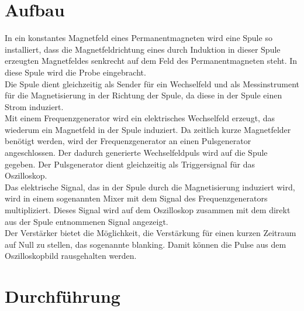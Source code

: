\documentclass[12pt,a4paper]{article}
\begin{document}
\section{Aufbau}
In ein konstantes Magnetfeld eines Permanentmagneten wird eine Spule so installiert, dass die Magnetfeldrichtung eines durch Induktion in dieser Spule erzeugten Magnetfeldes senkrecht auf dem Feld des Permanentmagneten steht. In diese Spule wird die Probe eingebracht. \\
Die Spule dient gleichzeitig als Sender für ein Wechselfeld und als Messinstrument für die Magnetisierung in der Richtung der Spule, da diese in der Spule einen Strom induziert.\\
Mit einem Frequenzgenerator wird ein elektrisches Wechselfeld erzeugt, das wiederum ein Magnetfeld in der Spule induziert. Da zeitlich kurze Magnetfelder benötigt werden, wird der Frequenzgenerator an einen Pulsgenerator angeschlossen. Der dadurch generierte Wechselfeldpuls wird auf die Spule gegeben. Der Pulsgenerator dient gleichzeitig als Triggersignal für das Oszilloskop.\\
Das elektrische Signal, das in der Spule durch die Magnetisierung induziert wird, wird in einem sogenannten Mixer mit dem Signal des Frequenzgenerators multipliziert. Dieses Signal wird auf dem Oszilloskop zusammen mit dem direkt aus der Spule entnommenen Signal angezeigt.\\
Der Verstärker bietet die Möglichkeit, die Verstärkung für einen kurzen Zeitraum auf Null zu stellen, das sogenannte blanking. Damit können die Pulse aus dem Oszilloskopbild rausgehalten werden.



\section{Durchführung}
\end{document}
